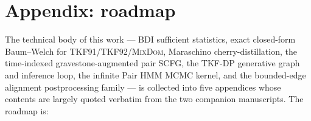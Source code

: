 \documentclass[11pt]{article}
\theoremstyle{definition}
\theoremstyle{remark}
\newcommand{\MixDom}{\textsc{MixDom}}
\begin{document}
\newpage
\section*{Appendix: roadmap}

The technical body of this work --- BDI sufficient statistics,
exact closed-form Baum--Welch for TKF91/TKF92/\MixDom, Maraschino
cherry-distillation, the time-indexed gravestone-augmented pair
SCFG, the TKF-DP generative graph and inference loop, the infinite
Pair HMM MCMC kernel, and the bounded-edge alignment
postprocessing family --- is collected into five appendices whose
contents are largely quoted verbatim from the two companion
manuscripts. The roadmap is:
\end{document}
